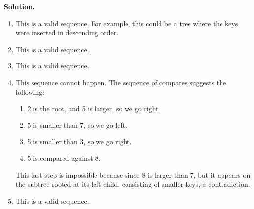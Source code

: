 \documentclass[12pt, a4paper]{article}
\newenvironment{sol}[1][Solution]
{\par\medskip\noindent \textbf{#1.} }
{\medskip}
\begin{document}
	\begin{sol}
		\begin{enumerate}[label=(\alph*)]
			\item This is a valid sequence. For example, this could be a tree where the
			keys were inserted in descending order.
			\item This is a valid sequence.
			\item This is a valid sequence.
			\item This sequence cannot happen. The sequence of compares suggests the following:
			\begin{enumerate}[label=(\roman*)]
				\item 2 is the root, and 5 is larger, so we go right.
				\item 5 is smaller than 7, so we go left.
				\item 5 is smaller than 3, so we go right.
				\item 5 is compared against 8.
			\end{enumerate}
			This last step is impossible because since 8 is larger than 7, but it
			appears on the subtree rooted at its left child, consisting of smaller
			keys,  a contradiction.
			\item This is a valid sequence.
		\end{enumerate}
	\end{sol}
	\pagebreak
	\printbibliography
\end{document}
